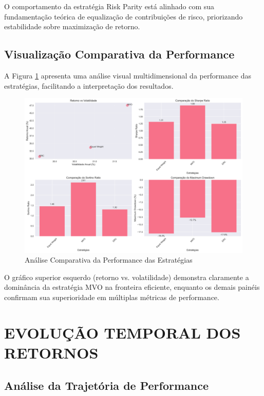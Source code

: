 O comportamento da estratégia Risk Parity está alinhado com sua fundamentação teórica de equalização de contribuições de risco, priorizando estabilidade sobre maximização de retorno.

\subsection{Visualização Comparativa da Performance}

A Figura \ref{fig:performance_comparativa} apresenta uma análise visual multidimensional da performance das estratégias, facilitando a interpretação dos resultados.

\begin{figure}[htbp]
\centering
\includegraphics[width=\textwidth]{../results/figures/performance_comparativa.png}
\caption{Análise Comparativa da Performance das Estratégias}
\label{fig:performance_comparativa}
\end{figure}

O gráfico superior esquerdo (retorno vs. volatilidade) demonstra claramente a dominância da estratégia MVO na fronteira eficiente, enquanto os demais painéis confirmam sua superioridade em múltiplas métricas de performance.

\section{EVOLUÇÃO TEMPORAL DOS RETORNOS}

\subsection{Análise da Trajetória de Performance}


